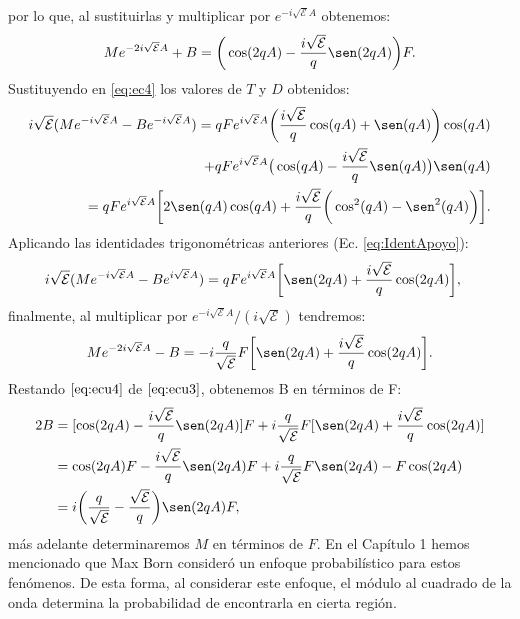 \documentclass[12pt]{article}
\theoremstyle{definition}
\begin{document}
por lo que, al sustituirlas y multiplicar por $e^{-i\sqrt{\mathcal{E}}A}$ obtenemos:
\begin{align}
    Me^{-2i\sqrt{\mathcal{E}}A} + B = \bigg(\cos(2qA)-\frac{i\sqrt{\mathcal{E}}}{q}\sen(2qA)\bigg)F.
    \label{eq:ecu3}
\end{align}
Sustituyendo en \eqref{eq:ec4} los valores de $T$ y $D$ obtenidos:
\begin{align*}
    i\sqrt{\mathcal{E}}( Me^{-i\sqrt{\mathcal{E}}A}-Be^{-i\sqrt{\mathcal{E}}A})  = qFe^{i\sqrt{\mathcal{E}}A}
    \bigg(\dfrac{i\sqrt{\mathcal{E}}}{q}\cos(qA) + \sen(qA)\bigg)\cos(qA)
    \\
    +
    qFe^{i\sqrt{\mathcal{E}}A}\big(\cos(qA) - \frac{i\sqrt{\mathcal{E}}}{q}\sen(qA)\big)\sen(qA)
    \\
     =
    qFe^{i\sqrt{\mathcal{E}}A}
    \bigg[2\sen(qA)\cos(qA)+\frac{i\sqrt{\mathcal{E}}}{q}\bigg(\cos^2(qA)-\sen^2(qA)\bigg)\bigg].
\end{align*}
Aplicando las identidades trigonométricas anteriores (Ec. \eqref{eq:IdentApoyo}):
\begin{align*}
    & i\sqrt{\mathcal{E}}( Me^{-i\sqrt{\mathcal{E}}A}-Be^{i\sqrt{\mathcal{E}}A})  = qFe^{i\sqrt{\mathcal{E}}A}\bigg[\sen(2qA)+\frac{i\sqrt{\mathcal{E}}}{q}\cos(2qA)\bigg],
\end{align*}
finalmente, al multiplicar por $e^{-i\sqrt{\mathcal{E}}A}/(i\sqrt{\mathcal{E}})$ tendremos:
\begin{align}
    Me^{-2i\sqrt{\mathcal{E}}A}-B = -i\frac{q}{\sqrt{\mathcal{E}}}F\bigg[\sen(2qA)+\frac{i\sqrt{\mathcal{E}}}{q}\cos(2qA)\bigg].
    \label{eq:ecu4}
\end{align}
Restando $\eqref{eq:ecu4}$  de $\eqref{eq:ecu3}$, obtenemos B en términos de F:
\begin{align*}
    2B & =
    [\cos(2qA)-\frac{i\sqrt{\mathcal{E}}}{q}\sen(2qA)]F + i\frac{q}{\sqrt{\mathcal{E}}}F[\sen(2qA)+\frac{i\sqrt{\mathcal{E}}}{q}\cos(2qA)]
    \\
    & 
    =
    \cos(2qA)F -\frac{i\sqrt{\mathcal{E}}}{q}\sen(2qA)F + i\frac{q}{\sqrt{\mathcal{E}}}F\sen(2qA)-F\cos(2qA)
    \\
    & 
    =
    i\bigg(\frac{q}{\sqrt{\mathcal{E}}} - \frac{\sqrt{\mathcal{E}}}{q} \bigg)\sen(2qA)F,
\end{align*}
más adelante determinaremos $M$ en términos de $F$. En el Capítulo 1 hemos mencionado que Max Born consideró un enfoque probabilístico para estos fenómenos. De esta forma, al considerar este enfoque, el módulo al cuadrado de la onda determina la probabilidad de encontrarla en cierta región. 
\end{document}
